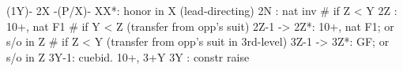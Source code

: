 (1Y)- 2X -(P/X)-
XX*: honor in X (lead-directing)
2N : nat inv
# if Z < Y
2Z : 10+, nat F1
# if Y < Z (transfer from opp's suit)
2Z-1 -> 2Z*: 10+, nat F1; or s/o in Z
# if Z < Y (transfer from opp's suit in 3rd-level)
3Z-1 -> 3Z*: GF; or s/o in Z
3Y-1: cuebid. 10+, 3+Y
3Y : constr raise